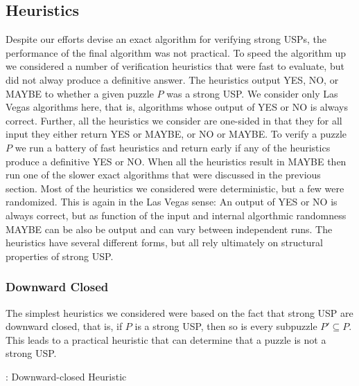 \documentclass[11pt]{article}
\newcommand\sse{\subseteq}
\begin{document}
\subsection{Heuristics}
\label{sec:heuristic}

Despite our efforts devise an exact algorithm for verifying strong
USPs, the performance of the final algorithm was not practical.  To
speed the algorithm up we considered a number of verification
heuristics that were fast to evaluate, but did not alway produce a
definitive answer.  The heuristics output YES, NO, or MAYBE to whether
a given puzzle $P$ was a strong USP.  We consider only Las Vegas
algorithms here, that is, algorithms whose output of YES or NO is
always correct.  Further, all the heuristics we consider are one-sided
in that they for all input they either return YES or MAYBE, or NO or
MAYBE.  To verify a puzzle $P$ we run a battery of fast heuristics and
return early if any of the heuristics produce a definitive YES or NO.
When all the heuristics result in MAYBE then run one of the slower
exact algorithms that were discussed in the previous section.  Most of
the heuristics we considered were deterministic, but a few were
randomized.  This is again in the Las Vegas sense: An output of YES or
NO is always correct, but as function of the input and internal
algorthmic randomness MAYBE can be also be output and can vary between
independent runs.  The heuristics have several different forms, but
all rely ultimately on structural properties of strong USP.

\subsubsection{Downward Closed}

The simplest heuristics we considered were based on the fact that
strong USP are downward closed, that is, if $P$ is a strong USP, then
so is every subpuzzle $P' \sse P$.  This leads to a practical heuristic
that can determine that a puzzle is not a strong USP.

\begin{algorithm}
  \caption{: Downward-closed Heuristic}
  \label{alg:downward-closed}
\begin{algorithmic}[1]
  \For{$P' \sse P, |P'| = s'$}
        \EndIf
  \EndFor{}
  \EndFunction
\end{algorithmic}
\end{algorithm}
\end{document}

